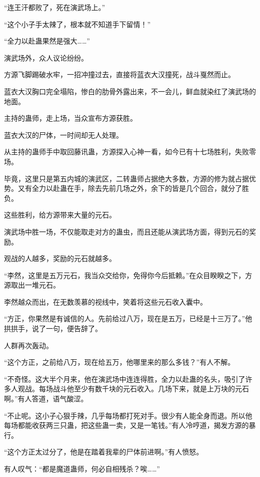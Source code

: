 
\begin{this_body}



“连王汗都败了，死在演武场上。”

“这个小子手太辣了，根本就不知道手下留情！”

“全力以赴蛊果然是强大……”

演武场外，众人议论纷纷。

方源飞脚踢破水牢，一招冲撞过去，直接将蓝衣大汉撞死，战斗戛然而止。

蓝衣大汉胸口完全塌陷，惨白的肋骨外露出来，不一会儿，鲜血就染红了演武场的地面。

主持的蛊师，走上场，当众宣布方源获胜。

蓝衣大汉的尸体，一时间却无人处理。

从主持的蛊师手中取回藤讯蛊，方源探入心神一看，如今已有十七场胜利，失败零场。

毕竟，这里只是第五内城的演武区，二转蛊师占据绝大多数，方源的修为就占据优势。又有全力以赴蛊在手，除去先前几场之外，余下的皆是几个回合，就分了胜负。

这些胜利，给方源带来大量的元石。

演武场中胜一场，不仅能取走对方的蛊虫，而且还能从演武场方面，得到元石的奖励。

观战的人越多，奖励的元石就越多。

“李然，这里是五万元石，我当众交给你，免得你今后抵赖。”在众目睽睽之下，方源取出一堆元石。

李然越众而出，在无数羡慕的视线中，笑着将这些元石收入囊中。

“方正，你果然是有诚信的人。先前给过八万，现在是五万，已经是十三万了。”他拱拱手，说了一句，便告辞了。

人群再次轰动。

“这个方正，之前给八万，现在给五万，他哪里来的那么多钱？”有人不解。

“不奇怪。这大半个月来，他在演武场中连连得胜，全力以赴蛊的名头，吸引了许多人观战。每场战斗他至少有数千块的元石收入。几场下来，就是上万块的元石啊。”有人答道，语气酸涩。

“不止呢。这小子心狠手辣，几乎每场都打死对手。很少有人能全身而退。所以他每场都能收获两三只蛊，把这些蛊一卖，又是一笔钱。”有人冷哼道，揭发方源的暴行。

“这个方正太过分了，他是在踏着我辈的尸体前进啊。”有人愤怒。

有人叹气：“都是魔道蛊师，何必自相残杀？唉……”


\end{this_body}

